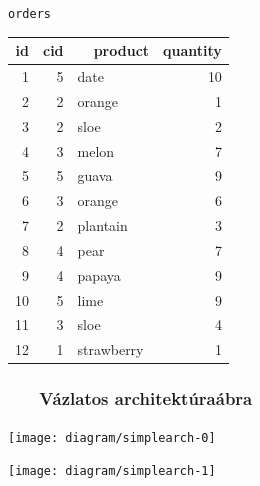 \documentclass[
    aspectratio=169,
]{beamer}
\newcommand{\slidetitle}[2]{\frametitle{{\small #1 ~ \ding{226} ~ } \normalsize \textbf{#2} }}
\begin{document}
\begin{frame}[fragile]
\begin{minipage}[c]{0.45\textwidth}
        \vspace{0.5cm}
        
        \normalsize \texttt{orders}
        \vspace{0.1cm}
        
        \tiny
        \begin{tabular}{ |r|r|l|r| }
        \hline
            id & cid & ~~product & quantity \\
        \hline
            1 & 5 & date & 10 \\
            2 & 2 & orange & 1 \\
            3 & 2 & sloe & 2 \\
            4 & 3 & melon & 7 \\
            5 & 5 & guava & 9 \\
            6 & 3 & orange & 6 \\
            7 & 2 & plantain & 3 \\
            8 & 4 & pear & 7 \\
            9 & 4 & papaya & 9 \\
            10 & 5 & lime & 9 \\
            11 & 3 & sloe & 4 \\
            12 & 1 & strawberry & 1 \\
        \hline
        \end{tabular}
    \end{minipage}
\end{frame}

\begin{frame}
    \slidetitle{\sectionshorttitle}{Vázlatos architektúraábra}
    
    \centering
    
    \begin{overprint}
        \centerline{\texttt{[image: diagram/simplearch-0]}}
        \centerline{\texttt{[image: diagram/simplearch-1]}}
    \end{overprint}
\end{frame}
\end{document}
